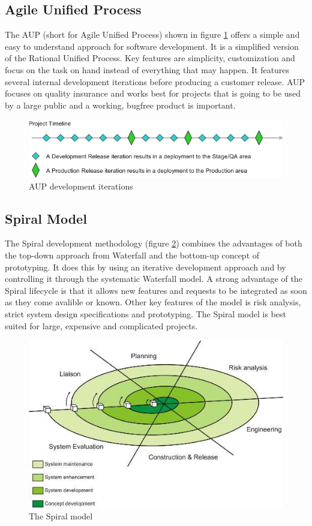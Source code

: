 \subsection{Agile Unified Process}
The AUP (short for Agile Unified Process) shown in figure \ref{fig:designmodel-aup} offers a simple and easy
to understand approach for software development. It is a simplified version of the Rational Unified Process.
Key features are simplicity, customization and focus on the task on hand instead of everything that may happen.
It features several internal development iterations before producing a customer release. AUP focuses on quality
insurance and works best for projects that is going to be used by a large public and a working, bugfree
product is important.
\begin{figure}[h!]
\centering \includegraphics[scale=0.65]{img/designmodel-aup}
\caption{AUP development iterations\cite{link:wiki}}
\label{fig:designmodel-aup}
\end{figure}

\subsection{Spiral Model}
The Spiral development methodology (figure \ref{fig:designmodel-spiral}) combines the advantages of both the top-down approach 
from Waterfall and the bottom-up concept of prototyping. It does this by using an iterative development
approach and by controlling it through the systematic Waterfall model. A strong advantage of the Spiral lifecycle is that it
allows new features and requests to be integrated as soon as they come avalible or known. Other key 
features of the model is risk analysis, strict system design specifications and prototyping. The Spiral model
 is best suited for large, expensive and complicated projects.
\begin{figure}[h!]
\centering \includegraphics[scale=0.85]{img/designmodel-spiral}
\caption{The Spiral model~\cite{link:spiral}}
\label{fig:designmodel-spiral}
\end{figure}


